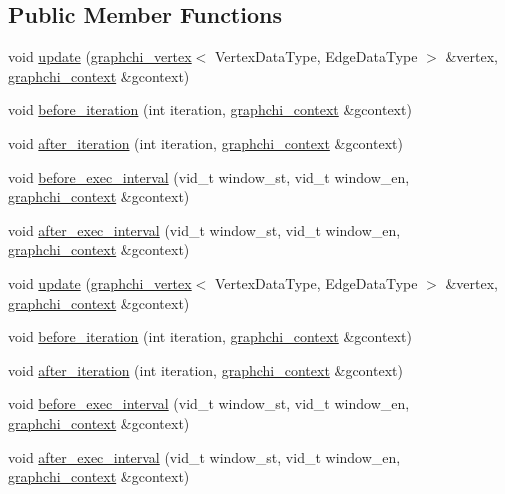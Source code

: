 \subsection*{Public Member Functions}
\begin{DoxyCompactItemize}
\item 
void \hyperlink{struct_smoke_test_program_afe153e12ae31476c82214b62417b791b}{update} (\hyperlink{classgraphchi_1_1graphchi__vertex}{graphchi\-\_\-vertex}$<$ Vertex\-Data\-Type, Edge\-Data\-Type $>$ \&vertex, \hyperlink{structgraphchi_1_1graphchi__context}{graphchi\-\_\-context} \&gcontext)
\item 
void \hyperlink{struct_smoke_test_program_a955ed7d1dd7ea0f5a12ddaefe299cc4b}{before\-\_\-iteration} (int iteration, \hyperlink{structgraphchi_1_1graphchi__context}{graphchi\-\_\-context} \&gcontext)
\item 
void \hyperlink{struct_smoke_test_program_a22ced893fb5769579406717abaf1c749}{after\-\_\-iteration} (int iteration, \hyperlink{structgraphchi_1_1graphchi__context}{graphchi\-\_\-context} \&gcontext)
\item 
void \hyperlink{struct_smoke_test_program_aa99545ae82126af27572baa2c834f737}{before\-\_\-exec\-\_\-interval} (vid\-\_\-t window\-\_\-st, vid\-\_\-t window\-\_\-en, \hyperlink{structgraphchi_1_1graphchi__context}{graphchi\-\_\-context} \&gcontext)
\item 
void \hyperlink{struct_smoke_test_program_ad2d4d576e0b10dc2b0e09ca6c54f625a}{after\-\_\-exec\-\_\-interval} (vid\-\_\-t window\-\_\-st, vid\-\_\-t window\-\_\-en, \hyperlink{structgraphchi_1_1graphchi__context}{graphchi\-\_\-context} \&gcontext)
\item 
void \hyperlink{struct_smoke_test_program_afe153e12ae31476c82214b62417b791b}{update} (\hyperlink{classgraphchi_1_1graphchi__vertex}{graphchi\-\_\-vertex}$<$ Vertex\-Data\-Type, Edge\-Data\-Type $>$ \&vertex, \hyperlink{structgraphchi_1_1graphchi__context}{graphchi\-\_\-context} \&gcontext)
\item 
void \hyperlink{struct_smoke_test_program_a955ed7d1dd7ea0f5a12ddaefe299cc4b}{before\-\_\-iteration} (int iteration, \hyperlink{structgraphchi_1_1graphchi__context}{graphchi\-\_\-context} \&gcontext)
\item 
void \hyperlink{struct_smoke_test_program_a22ced893fb5769579406717abaf1c749}{after\-\_\-iteration} (int iteration, \hyperlink{structgraphchi_1_1graphchi__context}{graphchi\-\_\-context} \&gcontext)
\item 
void \hyperlink{struct_smoke_test_program_aa99545ae82126af27572baa2c834f737}{before\-\_\-exec\-\_\-interval} (vid\-\_\-t window\-\_\-st, vid\-\_\-t window\-\_\-en, \hyperlink{structgraphchi_1_1graphchi__context}{graphchi\-\_\-context} \&gcontext)
\item 
void \hyperlink{struct_smoke_test_program_ad2d4d576e0b10dc2b0e09ca6c54f625a}{after\-\_\-exec\-\_\-interval} (vid\-\_\-t window\-\_\-st, vid\-\_\-t window\-\_\-en, \hyperlink{structgraphchi_1_1graphchi__context}{graphchi\-\_\-context} \&gcontext)
\end{DoxyCompactItemize}

